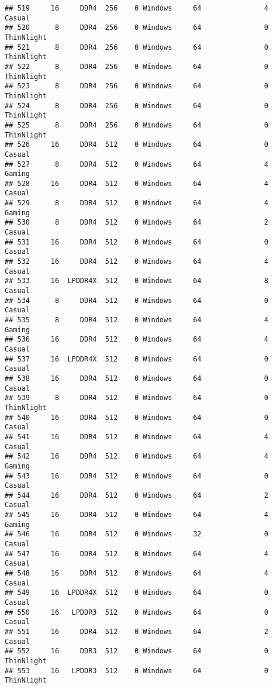 \documentclass[
]{article}
\begin{document}
\begin{verbatim}
## 519     16     DDR4  256    0 Windows     64               4     Casual
## 520      8     DDR4  256    0 Windows     64               0 ThinNlight
## 521      8     DDR4  256    0 Windows     64               0 ThinNlight
## 522      8     DDR4  256    0 Windows     64               0 ThinNlight
## 523      8     DDR4  256    0 Windows     64               0 ThinNlight
## 524      8     DDR4  256    0 Windows     64               0 ThinNlight
## 525      8     DDR4  256    0 Windows     64               0 ThinNlight
## 526     16     DDR4  512    0 Windows     64               0     Casual
## 527      8     DDR4  512    0 Windows     64               4     Gaming
## 528     16     DDR4  512    0 Windows     64               4     Casual
## 529      8     DDR4  512    0 Windows     64               4     Gaming
## 530      8     DDR4  512    0 Windows     64               2     Casual
## 531     16     DDR4  512    0 Windows     64               0     Casual
## 532     16     DDR4  512    0 Windows     64               4     Casual
## 533     16  LPDDR4X  512    0 Windows     64               8     Casual
## 534      8     DDR4  512    0 Windows     64               0     Casual
## 535      8     DDR4  512    0 Windows     64               4     Gaming
## 536     16     DDR4  512    0 Windows     64               4     Casual
## 537     16  LPDDR4X  512    0 Windows     64               0     Casual
## 538     16     DDR4  512    0 Windows     64               0     Casual
## 539      8     DDR4  512    0 Windows     64               0 ThinNlight
## 540     16     DDR4  512    0 Windows     64               0     Casual
## 541     16     DDR4  512    0 Windows     64               4     Casual
## 542     16     DDR4  512    0 Windows     64               4     Gaming
## 543     16     DDR4  512    0 Windows     64               0     Casual
## 544     16     DDR4  512    0 Windows     64               2     Casual
## 545     16     DDR4  512    0 Windows     64               4     Gaming
## 546     16     DDR4  512    0 Windows     32               0     Casual
## 547     16     DDR4  512    0 Windows     64               4     Casual
## 548     16     DDR4  512    0 Windows     64               4     Casual
## 549     16  LPDDR4X  512    0 Windows     64               0     Casual
## 550     16   LPDDR3  512    0 Windows     64               0     Casual
## 551     16     DDR4  512    0 Windows     64               2     Casual
## 552     16     DDR3  512    0 Windows     64               0 ThinNlight
## 553     16   LPDDR3  512    0 Windows     64               0 ThinNlight

\end{verbatim}
\end{document}
